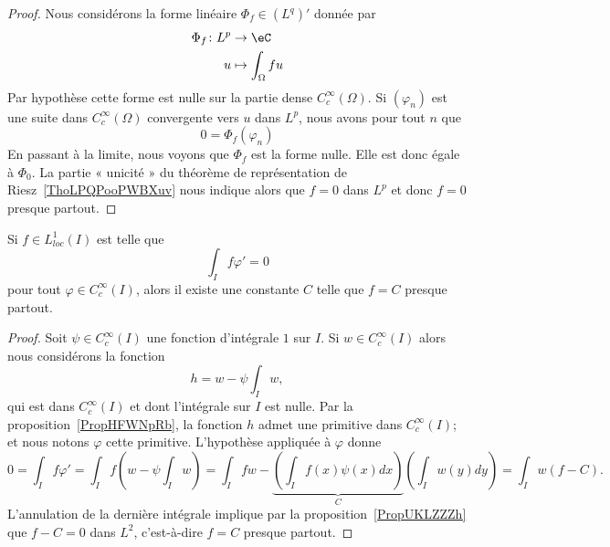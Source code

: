 \begin{proof}
    Nous considérons la forme linéaire \( \Phi_f\in (L^q)'\) donnée par
    \begin{equation}
        \begin{aligned}
            \Phi_f\colon L^p&\to \eC \\
            u&\mapsto \int_{\Omega}fu
        \end{aligned}
    \end{equation}
    Par hypothèse cette forme est nulle sur la partie dense \(  C^{\infty}_c(\Omega)\). Si \( (\varphi_n)\) est une suite dans \(  C^{\infty}_c(\Omega)\) convergente vers \( u\) dans \( L^p\), nous avons pour tout \( n\) que
    \begin{equation}
        0=\Phi_f(\varphi_n)
    \end{equation}
    En passant à la limite, nous voyons que \( \Phi_f\) est la forme nulle. Elle est donc égale à \( \Phi_0\). La partie « unicité » du théorème de représentation de Riesz~\ref{ThoLPQPooPWBXuv} nous indique alors que \( f=0\) dans \( L^p\) et donc \( f=0\) presque partout.
\end{proof}

\begin{proposition} \label{PropLGoLtcS}
    Si \( f\in L^1_{loc}(I)\) est telle que
    \begin{equation}
        \int_If\varphi'=0
    \end{equation}
    pour tout \( \varphi\in  C^{\infty}_c(I)\), alors il existe une constante \( C\) telle que \( f=C\) presque partout.
\end{proposition}

\begin{proof}
    Soit \( \psi\in C^{\infty}_c(I)\) une fonction d'intégrale \( 1\) sur \( I\). Si \( w\in C^{\infty}_c(I)\) alors nous considérons la fonction
    \begin{equation}
        h=w-\psi\int_Iw,
    \end{equation}
    qui est dans \(  C^{\infty}_c(I)\) et dont l'intégrale sur \( I\) est nulle. Par la proposition~\ref{PropHFWNpRb}, la fonction \( h\) admet une primitive dans \(  C^{\infty}_c(I)\); et nous notons \( \varphi\) cette primitive. L'hypothèse appliquée à \( \varphi\) donne
    \begin{equation}
        0=\int_If\varphi'=\int_If\left( w-\psi\int_Iw \right)=\int_Ifw-\underbrace{\left( \int_If(x)\psi(x)dx \right)}_C\left( \int_Iw(y)dy \right)=\int_Iw(f-C).
    \end{equation}
    L'annulation de la dernière intégrale implique par la proposition~\ref{PropUKLZZZh} que \( f-C=0\) dans \( L^2\), c'est-à-dire \( f=C\) presque partout.
\end{proof}

